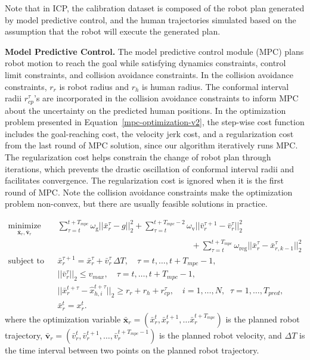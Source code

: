 Note that in ICP, the calibration dataset is composed of the robot plan generated by model predictive control, and the human trajectories simulated based on the assumption that the robot will execute the generated plan.

\textbf{Model Predictive Control.} The model predictive control module (MPC) plans robot motion to reach the goal while satisfying dynamics constraints, control limit constraints, and collision avoidance constraints. In the collision avoidance constraints, $r_r$ is robot radius and $r_h$ is human radius. The conformal interval radii $r_{cp}^{\tau}$'s are incorporated in the collision avoidance constraints to inform MPC about the uncertainty on the predicted human positions. In the optimization problem presented in Equation~\ref{mpc-optimization-v2}, the step-wise cost function includes the goal-reaching cost, the velocity jerk cost, and a regularization cost from the last round of MPC solution, since our algorithm iteratively runs MPC. The regularization cost helps constrain the change of robot plan through iterations, which prevents the drastic oscillation of conformal interval radii and facilitates convergence. The regularization cost is ignored when it is the first round of MPC. Note the collision avoidance constraints make the optimization problem non-convex, but there are usually feasible solutions in practice. 

\vspace{-10pt}
\begin{equation}
\label{mpc-optimization-v2}
\begin{aligned}
\operatorname*{minimize}_{\bar{\mathbf{x}}_r, \bar{\mathbf{v}}_r} \,
& \sum_{\tau=t}^{t+T_{mpc}} \omega_\text{g} ||\bar{x}_r^{\tau} - g||_2^2
+
\sum_{\tau=t}^{t+T_{mpc}-2} \omega_\text{v} ||\bar{v}_r^{\tau + 1} - \bar{v}_r^{\tau}||_2^2 \\
& \qquad \qquad \qquad \qquad \qquad \qquad \qquad \qquad +
\sum_{\tau=t}^{t+T_{mpc}} \omega_\text{reg} ||\bar{x}_r^{\tau} - \bar{x}_{r, k-1}^{\tau}||_2^2 \\
\text{subject to} \quad &\bar{x}_r^{\tau+1} = \bar{x}_r^\tau + \bar{v}_r^\tau \, \Delta T, \quad \tau = t, \ldots, t+T_{mpc}-1, \\
&||\bar{v}_r^\tau||_2 \leq v_{max}, \quad \tau = t, \ldots, t+T_{mpc}-1, \\
&||\bar{x}_r^{t + \tau} - \hat{x}_{h, i}^{t + \tau}||_2 \geq r_r + r_h + r_{cp}^\tau, \quad i = 1, \dots, N, \; \; \tau = 1, \dots, T_{pred}, \\
& \bar{x}_r^t = x_r^t.
\end{aligned}
\end{equation}
where the optimization variable $\bar{\mathbf{x}}_r = (\bar{x}_r^t, \bar{x}_r^{t + 1}, \dots \bar{x}_r^{t + T_{mpc}})$ is the planned robot trajectory, $\bar{\mathbf{v}}_r = (\bar{v}_r^t, \bar{v}_r^{t + 1}, \dots, \bar{v}_r^{t + T_{mpc} - 1})$ is the planned robot velocity, and $\Delta T$ is the time interval between two points on the planned robot trajectory.

